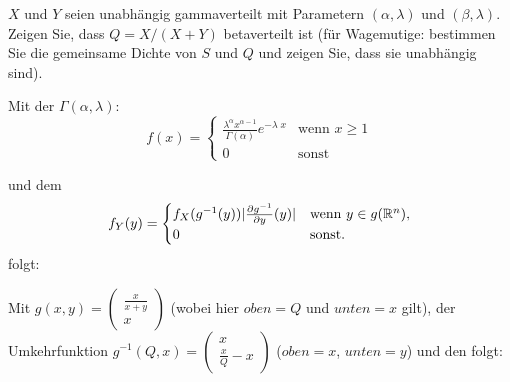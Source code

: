 \begin{uebsp}
\begin{Exercise}[label=ex:3.2]
$X$ und $Y$ seien unabhängig gammaverteilt mit Parametern $(\alpha, \lambda)$ und
$(\beta, \lambda)$. Zeigen Sie, dass $Q = X/(X + Y)$ betaverteilt ist (für Wagemutige:
bestimmen Sie die gemeinsame Dichte von $S$ und $Q$ und zeigen Sie, dass sie unabhängig sind).
\end{Exercise}
\begin{Answer}
\begin{uebsp_theory}
Mit der  $\Gamma(\alpha, \lambda)$:
    \[f(x) = \begin{cases} 
                \frac{\lambda^\alpha x^{\alpha-1}}{\Gamma(\alpha)}e^{-\lambda\; x} &\mbox{wenn } x \geq 1 \\
                0 & \mbox{sonst}
                \end{cases}\]
\end{uebsp_theory}

\begin{uebsp_theory}
    und dem 
    \[f_Y(y)=\begin{cases}f_X(g^{-1}(y))|{\partial g^{-1}\over\partial y}(y)| &\mbox{wenn } y \in g(\mathbb{R}^n), \\
    0 & \mbox{sonst.}\end{cases}\]
    folgt:
\end{uebsp_theory}

Mit $g(x,y)=\left( \begin{array}{c} \frac{x}{x+y} \\ x \end{array} \right)$ (wobei hier $oben=Q$ und $unten=x$ gilt), der Umkehrfunktion $g^{-1}(Q,x)=\left( \begin{array}{c} x \\ \frac{x}{Q}-x \end{array} \right)$ ($oben=x$, $unten=y$) und den  folgt:


\end{Answer}
\end{uebsp}
